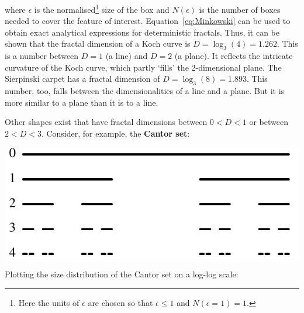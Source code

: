 \noindent where $\epsilon$ is the normalised\footnote{Here the units
  of $\epsilon$ are chosen so that $\epsilon\leq{1}$ and
  $N(\epsilon=1) = 1$.}  size of the box and $N(\epsilon)$ is the
number of boxes needed to cover the feature of
interest. Equation~\ref{eq:Minkowski} can be used to obtain exact
analytical expressions for deterministic fractals. Thus, it can be
shown that the fractal dimension of a Koch curve is
$D=\log_{3}(4)=1.262$. This is a number between $D=1$ (a line) and
$D=2$ (a plane). It reflects the intricate curvature of the Koch
curve, which partly `fills' the 2-dimensional plane.  The Sierpinski
carpet has a fractal dimension of $D=\log_{3}(8)=1.893$. This number,
too, falls between the dimensionalities of a line and a plane. But it
is more similar to a plane than it is to a line.\medskip

Other shapes exist that have fractal dimensions between $0 < D < 1$ or
between $2 < D < 3$. Consider, for example, the \textbf{Cantor set}:

\noindent\begin{minipage}[t][][b]{.4\textwidth}
  \includegraphics[width=\textwidth]{../figures/cantor.pdf}\medskip
\end{minipage}
\begin{minipage}[t][][t]{.6\textwidth}
  \label{fig:cantor}
\end{minipage}

Plotting the size distribution of the Cantor set on a log-log scale:

